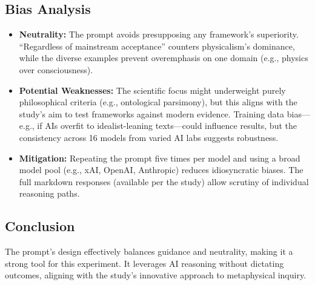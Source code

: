 \documentclass[11pt]{article}
\begin{document}
\subsection{Bias Analysis}
\begin{itemize}
  \item \textbf{Neutrality:} The prompt avoids presupposing any framework’s superiority. ``Regardless of mainstream acceptance'' counters physicalism’s dominance, while the diverse examples prevent overemphasis on one domain (e.g., physics over consciousness).
  \item \textbf{Potential Weaknesses:} The scientific focus might underweight purely philosophical criteria (e.g., ontological parsimony), but this aligns with the study’s aim to test frameworks against modern evidence. Training data bias—e.g., if AIs overfit to idealist-leaning texts—could influence results, but the consistency across 16 models from varied AI labs suggests robustness.
  \item \textbf{Mitigation:} Repeating the prompt five times per model and using a broad model pool (e.g., xAI, OpenAI, Anthropic) reduces idiosyncratic biases. The full markdown responses (available per the study) allow scrutiny of individual reasoning paths.
\end{itemize}

\subsection{Conclusion}
The prompt’s design effectively balances guidance and neutrality, making it a strong tool for this experiment. It leverages AI reasoning without dictating outcomes, aligning with the study’s innovative approach to metaphysical inquiry.
\end{document}

